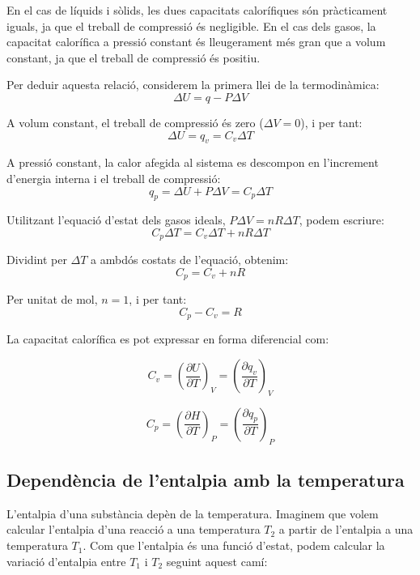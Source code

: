 En el cas de líquids i sòlids, les dues capacitats calorífiques són pràcticament iguals, ja que el treball de compressió és negligible. En el cas dels gasos, la capacitat calorífica a pressió constant és lleugerament més gran que a volum constant, ja que el treball de compressió és positiu. 

\begin{mybox}[title=Relació entre la capacitat calorífica a pressió constant i a volum constant] 
Per deduir aquesta relació, considerem la primera llei de la termodinàmica:
\[
    \Delta U = q - P \Delta V
\]

A volum constant, el treball de compressió és zero ($\Delta V = 0$), i per tant:
\[
    \Delta U = q_v = C_v \Delta T
\]

A pressió constant, la calor afegida al sistema es descompon en l'increment d'energia interna i el treball de compressió:
\[
    q_p = \Delta U + P \Delta V = C_p \Delta T
\]

Utilitzant l'equació d'estat dels gasos ideals, $P \Delta V = nR \Delta T$, podem escriure:
\[
    C_p \Delta T = C_v \Delta T + nR \Delta T
\]

Dividint per $\Delta T$ a ambdós costats de l'equació, obtenim:
\[
    C_p = C_v + nR
\]

Per unitat de mol, $n = 1$, i per tant:
\[
    C_p - C_v = R
\]

\end{mybox}

La capacitat calorífica es pot expressar en forma diferencial com:

\begin{equation}
    C_v = \left( \frac{\partial U}{\partial T} \right)_V = \left( \frac{\partial q_v}{\partial T} \right)_V
\end{equation}

\begin{equation}
    C_p = \left( \frac{\partial H}{\partial T} \right)_P = \left( \frac{\partial q_p}{\partial T} \right)_P
\end{equation}

\subsection{Dependència de l'entalpia amb la temperatura}

L'entalpia d'una substància depèn de la temperatura. Imaginem que volem calcular l'entalpia d'una reacció a una temperatura $T_2$ a partir de l'entalpia a una temperatura $T_1$. Com que l'entalpia és una funció d'estat, podem calcular la variació d'entalpia entre $T_1$ i $T_2$ seguint aquest camí:

